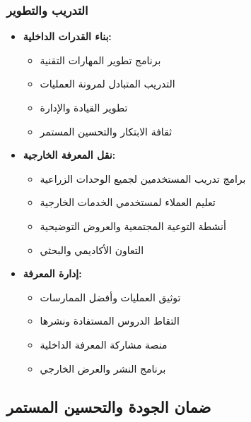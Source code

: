 \subsubsection{التدريب والتطوير}
\begin{itemize}
    \item \textbf{بناء القدرات الداخلية:}
    \begin{itemize}
        \item برنامج تطوير المهارات التقنية
        \item التدريب المتبادل لمرونة العمليات
        \item تطوير القيادة والإدارة
        \item ثقافة الابتكار والتحسين المستمر
    \end{itemize}
    
    \item \textbf{نقل المعرفة الخارجية:}
    \begin{itemize}
        \item برامج تدريب المستخدمين لجميع الوحدات الزراعية
        \item تعليم العملاء لمستخدمي الخدمات الخارجية
        \item أنشطة التوعية المجتمعية والعروض التوضيحية
        \item التعاون الأكاديمي والبحثي
    \end{itemize}
    
    \item \textbf{إدارة المعرفة:}
    \begin{itemize}
        \item توثيق العمليات وأفضل الممارسات
        \item التقاط الدروس المستفادة ونشرها
        \item منصة مشاركة المعرفة الداخلية
        \item برنامج النشر والعرض الخارجي
    \end{itemize}
\end{itemize}

\subsection{ضمان الجودة والتحسين المستمر}

